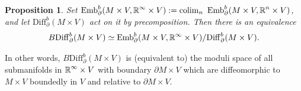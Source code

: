 \documentclass[a4paper, oneside]{amsart}
\newtheorem{proposition}[theorem]{Proposition}
\newcommand{\diff}{\mathrm{Diff}}
\newcommand{\emb}{\operatorname{Emb}}
\newcommand{\1}{\mathds{1}}
\theoremstyle{remark}
\theoremstyle{definition}
\newcommand{\R}{{\scaleobj{0.97}{\mathbb{R}}}}
\numberwithin{equation}{section}
\begin{document}
\begin{proposition}\label{Bdiffbmodelprop}
    Set $\emb_\partial^b(M\times V, \R^\infty\times V):=\operatorname{colim}_{n}\ \emb_\partial^b(M\times V, \R^n\times V)$, and let $\diff^b_\partial(M\times V)$ act on it  by precomposition. Then there is an equivalence
    $$
B\diff_\partial^b(M\times V)\simeq \emb^b_\partial(M\times V,\R^\infty\times V)/\diff^b_\partial(M\times V).
    $$
\end{proposition}
In other words, $B\diff^b_\partial(M\times V)$ is (equivalent to) the moduli space of all submanifolds in $\R^\infty\times V$ with boundary $\partial M\times V$ which are diffeomorphic to $M\times V$ boundedly in $V$ and relative to $\partial M\times V$. 
\end{document}
